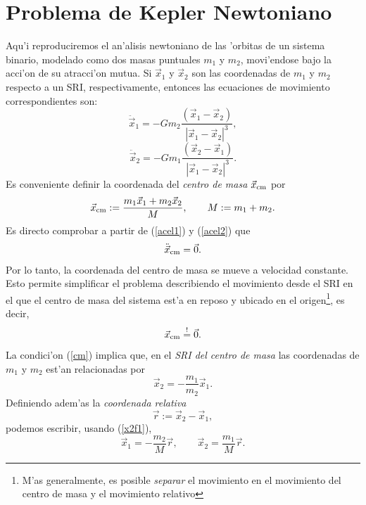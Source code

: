 \chapter{Problema de Kepler Newtoniano}\label{app:Kepler}

Aqu'i reproduciremos el an'alisis newtoniano de las 'orbitas de un sistema binario, modelado como dos masas puntuales $m_1$ y $m_2$, movi'endose bajo la acci'on de su atracci'on mutua. Si $\vec{x}_1$ y $\vec{x}_2$ son las coordenadas de $m_1$ y $m_2$ respecto a un SRI, respectivamente, entonces las ecuaciones de movimiento correspondientes son:
\begin{equation}
\ddot{\vec{x}}_1=-Gm_2\frac{(\vec{x}_1-\vec{x}_2)}{|\vec{x}_1-\vec{x}_2|^3} ,\label{acel1}
\end{equation}
\begin{equation}
\ddot{\vec{x}}_2=-Gm_1\frac{(\vec{x}_2-\vec{x}_1)}{|\vec{x}_1-\vec{x}_2|^3} .\label{acel2}
\end{equation}
Es conveniente definir la coordenada del \textit{centro de masa} $\vec{x}_{\rm cm}$ por
\begin{equation}
\vec{x}_{\rm cm}:=\frac{m_1\vec{x}_1+m_2\vec{x}_2}{M}, \qquad M:=m_1+m_2.
\end{equation}
Es directo comprobar a partir de (\ref{acel1}) y (\ref{acel2}) que
\begin{equation}
\ddot{\vec{x}}_{\rm cm}=\vec{0}.
\end{equation}
Por lo tanto, la coordenada del centro de masa se mueve a velocidad constante. Esto permite simplificar el problema describiendo el movimiento desde el SRI en el que el centro de masa del sistema est'a en reposo y ubicado en el origen\footnote{M'as generalmente, es posible \textit{separar} el movimiento en el movimiento del centro de masa y el movimiento relativo}, es decir,
\begin{equation}
\vec{x}_{\rm cm}\stackrel{!}{=}\vec{0}. \label{cm}
\end{equation}
La condici'on (\ref{cm}) implica que, en el \textit{SRI del centro de masa} las coordenadas de $m_1$ y $m_2$ est'an relacionadas por
\begin{equation}
\vec{x}_2=-\frac{m_1}{m_2}\vec{x}_1. \label{x2f1}
\end{equation}
Definiendo adem'as la \textit{coordenada relativa}
\begin{equation}
\vec{r}:=\vec{x}_2-\vec{x}_1,
\end{equation}
podemos escribir, usando (\ref{x2f1}),
\begin{equation}\label{x12fr}
\vec{x}_1=-\frac{m_2}{M}\vec{r}, \qquad \vec{x}_2=\frac{m_1}{M}\vec{r}.
\end{equation}
